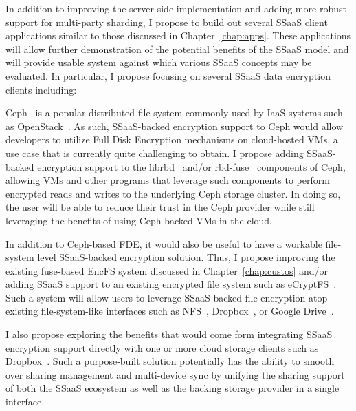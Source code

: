 In addition to improving the server-side implementation and adding
more robust support for multi-party sharding, I propose to build out
several SSaaS client applications similar to those discussed in
Chapter~\ref{chap:apps}. These applications will allow further
demonstration of the potential benefits of the SSaaS model and will
provide usable system against which various SSaaS concepts may be
evaluated. In particular, I propose focusing on several SSaaS data
encryption clients including:

\begin{packed_desc}
\item[Ceph Encryption Support:] Ceph~\cite{ceph} is a popular
  distributed file system commonly used by IaaS systems such as
  OpenStack~\cite{openstack}. As such, SSaaS-backed encryption support
  to Ceph would allow developers to utilize Full Disk Encryption
  mechanisms on cloud-hosted VMs, a use case that is currently quite
  challenging to obtain. I propose adding SSaaS-backed encryption
  support to the librbd~\cite{ceph-librbd-python, ceph-librbd-src}
  and/or rbd-fuse~\cite{ceph-rbdfuse} components of Ceph, allowing VMs
  and other programs that leverage such components to perform
  encrypted reads and writes to the underlying Ceph storage
  cluster. In doing so, the user will be able to reduce their trust in
  the Ceph provider while still leveraging the benefits of using
  Ceph-backed VMs in the cloud.
\item[File-system Encryption Support:] In addition to Ceph-based FDE,
  it would also be useful to have a workable file-system level
  SSaaS-backed encryption solution. Thus, I propose improving the
  existing fuse-based EncFS system discussed in
  Chapter~\ref{chap:custos} and/or adding SSaaS support to an existing
  encrypted file system such as eCryptFS~\cite{ecryptfs}. Such a
  system will allow users to leverage SSaaS-backed file encryption
  atop existing file-system-like interfaces such as
  NFS~\cite{sandberg1985}, Dropbox~\cite{dropbox}, or Google
  Drive~\cite{google-drive}.
\item[Cloud Encryption Support:] I also propose exploring the benefits
  that would come form integrating SSaaS encryption support directly
  with one or more cloud storage clients such as
  Dropbox~\cite{dropbox}. Such a purpose-built solution potentially
  has the ability to smooth over sharing management and multi-device
  sync by unifying the sharing support of both the SSaaS ecosystem as
  well as the backing storage provider in a single interface.
\end{packed_desc}

